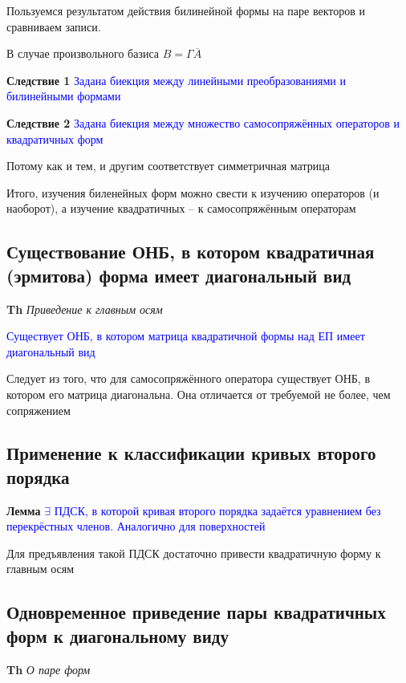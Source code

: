 \documentclass[a4paper, 14pt]{article}
\begin{document}
    Пользуемся результатом действия билинейной формы на паре векторов и сравниваем записи.
    
    В случае произвольного базиса $B = \Gamma \overline{A}$
    
    \textbf{Следствие 1} \textcolor{blue}{Задана биекция между линейными преобразованиями и билинейными формами}
    
    \textbf{Следствие 2} \textcolor{blue}{Задана биекция между множество самосопряжённых операторов и квадратичных форм}
    
    Потому как и тем, и другим соответствует симметричная матрица
    
    Итого, изучения биленейных форм можно свести к изучению операторов (и наоборот), а изучение квадратичных -- к
    самосопряжённым операторам
    
    \subsection{Существование ОНБ, в котором квадратичная (эрмитова) форма имеет диагональный вид}
    
    \textbf{Th} \textit{Приведение к главным осям}
    
    \textcolor{blue}{Существует ОНБ, в котором матрица квадратичной формы над ЕП имеет диагональный вид}
    
    Следует из того, что для самосопряжённого оператора существует ОНБ, в котором его матрица диагональна.
    Она отличается от требуемой не более, чем сопряжением
    
    \subsection{Применение к классификации кривых второго порядка}
    
    \textbf{Лемма} \textcolor{blue}{$\exists$ ПДСК, в которой кривая второго порядка задаётся уравнением без
    перекрёстных членов. Аналогично для поверхностей}
    
    Для предъявления такой ПДСК достаточно привести квадратичную форму к главным осям
    
    \subsection{Одновременное приведение пары квадратичных форм к диагональному виду}
    
    \textbf{Th} \textit{О паре форм}
    
\end{document}
